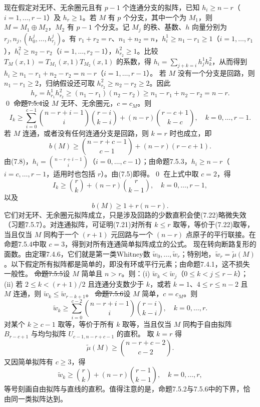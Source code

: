 现在假定对无环、无余圈元且有 $p-1$ 个连通分支的拟阵，已知 $h_i\ge n-r$（$i=1,\ldots,r-1$）及 $h_r\ge1$。若 $M$ 有 $p$ 个分支，其中一个为 $M_1$，则 $M=M_1\oplus M_2$，$M_2$ 有 $p-1$ 个分支。记 $M_j$ 的秩、基数、$h$ 向量分别为 $r_j,n_j,(h_0^j,\ldots,h_{r_j}^j)$。有 $r_1+r_2=r$、$n_1+n_2=n$，$h_i^1\ge n_1-r_1\ge1$（$i=1,\ldots,r_1$），$h_i^2\ge n_2-r_2$（$i=1,\ldots,r_2-1$），$h_{r_2}^2\ge1$。比较 $T_M(x,1)=T_{M_1}(x,1)T_{M_2}(x,1)$ 的系数，得 $h_i=\sum_{j+k=i}h_j^1h_k^2$，从而得到 $h_i\ge n_1-r_1+n_2-r_2=n-r$（$i=1,\ldots,r-1$）。
若 $M$ 没有一个分支是回路，则 $n_1-r_1\ge2$，归纳假设还可取 $h_{r_2}^2\ge n_2-r_2\ge2$。因此
\[h_r=h_{r_1}^1h_{r_2}^2\ge(n_1-r_1)(n_2-r_2)\ge n_1-r_1+n_2-r_2=n-r.\]\qed
\st{命题7.5.4}设 $M$ 无环、无余圈元，$c=c_M$。则
\[I_k\ge\sum_{i=0}^{c-1}\binom{n-r+i-1}{i}\binom{r-i}{k-i}+(n-r)\binom{r-c+1}{k-c},\quad k=0,\ldots,r-1.\]
若 $M$ 连通，或者没有任何连通分支是回路，则 $k=r$ 时也成立，即
\[b(M)\ge\binom{n-r+c-1}{c-1}+(n-r)(r-c+1).\]
\pr 由(7.8)，$h_i=\binom{n-r+i-1}i$（$i=0,\ldots,c-1$）；由命题7.5.3，$h_i\ge n-r$（$i=c,\ldots,r-1$，适用时也包括 $r$）。由(7.5)即得。\qed
在上式中取 $c=2$，得
\[I_k\ge\binom rk+(n-r)\binom r{k-1},\quad k=0,\ldots,r-1,\tag{7.21}\]
以及
\[b(M)\ge1+r(n-r).\tag{7.22}\]
它们对无环、无余圈元拟阵成立，只是涉及回路的少数直积会使(7.22)略微失效（习题7.5.7）。对连通拟阵，可证明(7.21)对所有 $k\le r$ 取等，等价于(7.22)取等，当且仅当 $M$ 同构于一个 $(r+1)$ 元回路与一个 $(n-r)$ 点原子的平行联接。在命题7.5.4中取 $c=3$，得到对所有连通简单拟阵成立的公式。
现在转向断路复形的面数。由定理7.4.6，它们就是第一类Whitney数 $\widetilde w_0,\ldots,\widetilde w_r$；特别地，$\widetilde w_r=\widetilde\mu(M)$。以下假定所有拟阵都是简单的，即没有环或平行元素；由命题7.4.1，这不损失一般性。
\st{命题7.5.5}设 $M$ 简单且 $n>r$。则：(i) $\widetilde w_k<\widetilde w_j$（$0\le k<j\le r-k$）；(ii) 若 $2\le k<(r+1)/2$ 且连通分支数少于 $k$，或若 $k=1$、$4\le r\le n-2$ 且 $M$ 连通，则 $\widetilde w_k\le\widetilde w_{r-k+1}$。
\st{命题7.5.6}设 $M$ 简单，$c=c_M$。则
\[\widetilde w_k\ge\sum_{i=0}^{c-2}\binom{n-r+i-1}{i}\binom{r-i}{k-i},\quad k=0,\ldots,r.\]
对某个 $k\ge c-1$ 取等，等价于所有 $k$ 取等，当且仅当 $M$ 同构于自由拟阵 $B_{r-c+1}$ 与均匀拟阵 $U_{c-1,n-r+c-1}$ 的直积。
取 $k=r$ 得
\[\widetilde\mu(M)\ge\binom{n-r+c-2}{c-2}.\tag{7.23}\]
又因简单拟阵有 $c\ge3$，得
\[\widetilde w_k\ge\binom rk+(n-r)\binom{r-1}{k-1},\quad k=0,\ldots,r,\tag{7.24}\]
等号刻画自由拟阵与直线的直积。值得注意的是，命题7.5.2与7.5.6中的下界，恰由同一类拟阵达到。
